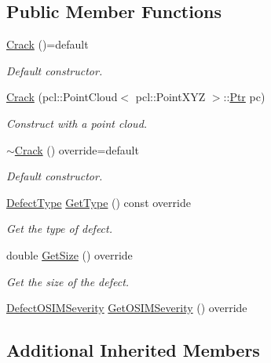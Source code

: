 \subsection*{Public Member Functions}
\begin{DoxyCompactItemize}
\item 
\hyperlink{classbeam__defects_1_1_crack_ada9aa870e95e7799bc609891cb586d13}{Crack} ()=default
\begin{DoxyCompactList}\small\item\em Default constructor. \end{DoxyCompactList}\item 
\hyperlink{classbeam__defects_1_1_crack_a29c3ebe842c944977cbe981b3d33c6de}{Crack} (pcl\+::\+Point\+Cloud$<$ pcl\+::\+Point\+X\+YZ $>$\+::\hyperlink{classbeam__defects_1_1_defect_a0a7708c6cd92ac482d45ef606d598325}{Ptr} pc)
\begin{DoxyCompactList}\small\item\em Construct with a point cloud. \end{DoxyCompactList}\item 
\hyperlink{classbeam__defects_1_1_crack_a45cdf3cda68b22c313b832593c5ec4eb}{$\sim$\+Crack} () override=default
\begin{DoxyCompactList}\small\item\em Default constructor. \end{DoxyCompactList}\item 
\hyperlink{group__defects_gae379b271bd5fb7ce92afe1abee917249}{Defect\+Type} \hyperlink{classbeam__defects_1_1_crack_a1f6ede9707c63376e6d409b388770c07}{Get\+Type} () const override
\begin{DoxyCompactList}\small\item\em Get the type of defect. \end{DoxyCompactList}\item 
double \hyperlink{classbeam__defects_1_1_crack_a140c08ad86be9062cf4c9b0bfe686d67}{Get\+Size} () override
\begin{DoxyCompactList}\small\item\em Get the size of the defect. \end{DoxyCompactList}\item 
\hyperlink{group__defects_gaed38c449f8cba57f35d1af04496a0711}{Defect\+O\+S\+I\+M\+Severity} \hyperlink{classbeam__defects_1_1_crack_a55b689875191ba9049134456d4d2889b}{Get\+O\+S\+I\+M\+Severity} () override
\end{DoxyCompactItemize}
\subsection*{Additional Inherited Members}


